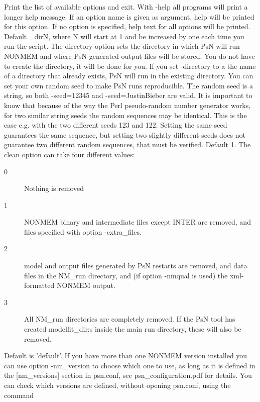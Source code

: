 \begin{optionlist}
Print the list of available options and exit. 
\nextopt
{}
With -help all programs will print a longer help message. 
If an option name is given as argument, help will be printed for this option. 
If no option is specified, help text for all options will be printed. 
\nextopt
{}
Default \guidetoolname\_dirN,
where N will start at 1 and
be increased by one each time you run the script. The directory option sets the directory in which PsN 
will run NONMEM and where PsN-generated output files will be stored. 
You do not have to create the directory,  it will be done for you. If you set
-directory to a the name of a directory that already exists, PsN will run in the existing directory.
\nextopt
{}
You can set your own random seed to make PsN runs reproducible.
The random seed is a string, so both -seed=12345 and -seed=JustinBieber are valid.
It is important to know that because of the way the Perl pseudo-random
number generator works, for two similar string seeds the random sequences may be identical. 
This is the case e.g. with the two different seeds 123 and 122. 
Setting the same seed guarantees the same sequence, but setting two slightly different 
seeds does not guarantee two different random sequences, that must be verified.
\nextopt
{}
Default 1. The clean option can take four different values:  
\begin{description}
\item[0] Nothing is removed 
\item[1] NONMEM binary and intermediate files except INTER are removed, and files specified with option -extra\_files. 
\item[2] model and output files generated by PsN restarts are removed, and data files in the NM\_run directory, and (if option -nmqual is used) the xml-formatted NONMEM output. 
\item[3] All NM\_run directories are completely removed. If the PsN tool has created modelfit\_dir:s inside the main run directory, these  will also be removed. 
\end{description}
\nextopt
{}
Default is 'default'. 
If you have more than one NONMEM version installed you can use option
-nm\_version to choose which one to use, as long as it is 
defined in the [nm\_versions] section in psn.conf, see psn\_configuration.pdf for details. 
You can check which versions are defined, without opening psn.conf, using the command

\end{optionlist}
